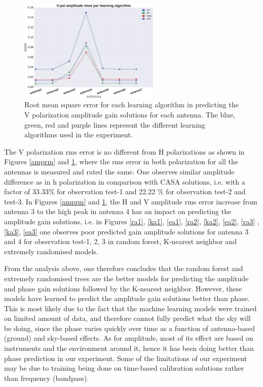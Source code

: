 \begin{figure}[H]
  \centering
    \includegraphics[width=0.6\textwidth]{images/Vpol-amp.eps}
    \caption{Root mean square error for each learning algorithm in predicting the V polarization amplitude gain solutions for each antenna. The blue, green, red and purple lines represent the different learning algorithms used in the experiment.}
  \label{amprmv}
 \end{figure} 

The V polarization rms error is no different from H polarizations as shown in Figures \ref{amprm} and \ref{amprmv}, where the rms error in both polarization for all the antennas is measured and rated the same. One observes similar amplitude  difference as in h polarization in comparison with CASA solutions, i.e. with a factor of 33.33$\%$ for observation test-1 and 22.22 $\%$ for observation test-2 and test-3. In Figures \ref{amprm} and \ref{amprmv}, the H and V amplitude rms error increase from antenna 3 to the high peak in antenna 4 has an impact on predicting the amplitude gain solutions, i.e. in Figures \ref{ra1}, \ref{ka1}, \ref{ea1}, \ref{ra2}, \ref{ka2}, \ref{ea2}, \ref{ra3} ,\ref{ka3}, \ref{ea3} one observes poor predicted gain amplitude solutions for antenna 3 and 4 for observation test-1, 2, 3 in random forest, K-nearest neighbor and extremely randomised models.

From the analysis above, one therefore concludes that the random forest and extremely randomised trees are the better models for predicting the amplitude and phase gain solutions followed by the K-nearest neighbor. However, these models have learned to predict the amplitude gain solutions better than phase. This is most likely due to the fact that the machine learning models were trained on limited amount of data, and therefore cannot fully predict what the sky will be doing, since the phase varies quickly over time as a function of antenna-based (ground) and sky-based effects. As for amplitude, most of its effect are based on instruments and the environment around it, hence it has been doing better than phase prediction in our experiment. Some of the limitations of our experiment may be due to training being done on time-based calibration solutions rather than frequency (bandpass). 

